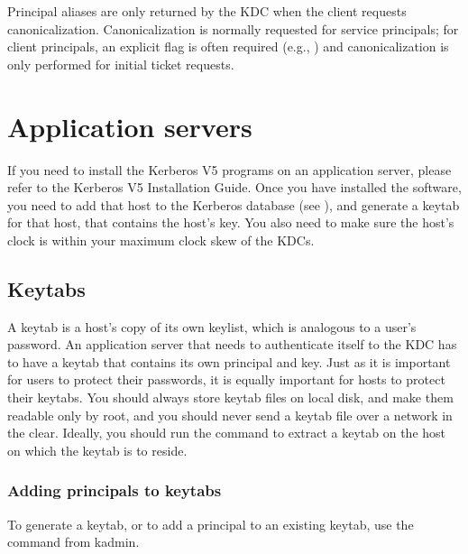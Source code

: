\documentclass[letterpaper,10pt,english]{sphinxmanual}
\begin{document}
Principal aliases are only returned by the KDC when the client
requests canonicalization.  Canonicalization is normally requested for
service principals; for client principals, an explicit flag is often
required (e.g., ) and canonicalization is only performed
for initial ticket requests.


\chapter{Application servers}
\label{\detokenize{admin/appl_servers::doc}}\label{\detokenize{admin/appl_servers:application-servers}}
If you need to install the Kerberos V5 programs on an application
server, please refer to the Kerberos V5 Installation Guide.  Once you
have installed the software, you need to add that host to the Kerberos
database (see {\hyperref[\detokenize{admin/database:add-mod-del-princs}]{}}), and generate a keytab for
that host, that contains the host’s key.  You also need to make sure
the host’s clock is within your maximum clock skew of the KDCs.


\section{Keytabs}
\label{\detokenize{admin/appl_servers:keytabs}}
A keytab is a host’s copy of its own keylist, which is analogous to a
user’s password.  An application server that needs to authenticate
itself to the KDC has to have a keytab that contains its own principal
and key.  Just as it is important for users to protect their
passwords, it is equally important for hosts to protect their keytabs.
You should always store keytab files on local disk, and make them
readable only by root, and you should never send a keytab file over a
network in the clear.  Ideally, you should run the {\hyperref[\detokenize{admin/admin_commands/kadmin_local:kadmin-1}]{}}
command to extract a keytab on the host on which the keytab is to
reside.


\subsection{Adding principals to keytabs}
\label{\detokenize{admin/appl_servers:adding-principals-to-keytabs}}\label{\detokenize{admin/appl_servers:add-princ-kt}}
To generate a keytab, or to add a principal to an existing keytab, use
the  command from kadmin.
\end{document}

